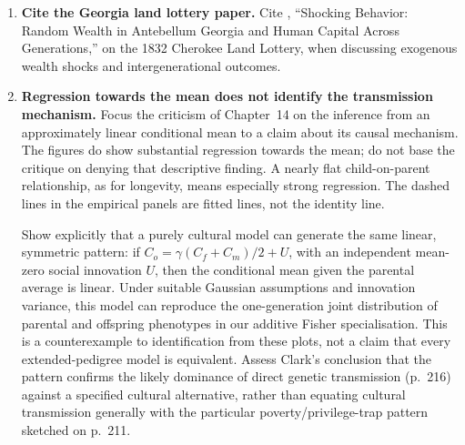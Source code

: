 \documentclass[12pt]{article}
\renewenvironment{itemize}{\begin{enumerate}}{\end{enumerate}}
\begin{document}
\begin{itemize}
\par\medskip
\textit{Preferred option: homogeneity of consumer demand.}
In the standard consumer model, doubling all prices and nominal income
leaves the budget set unchanged. With unchanged preferences and a unique
optimum, it therefore leaves demand unchanged. Homogeneity of demand is
a consequence of the model, not an additional assumption to be accepted
or discarded independently. A fitted demand equation that responds to
this common rescaling may be useful descriptively, but it cannot
represent the maintained choice model. Likewise, the phenotypic-assortment
model does not permit independent choices of $m$, $r$ and $h^2$: its
assumptions require $m=h^2r$.

\item \textbf{Cite the Georgia land lottery paper.}
Cite \citet{BleakleyFerrie2016}, ``Shocking Behavior: Random Wealth in
Antebellum Georgia and Human Capital Across Generations,'' on the 1832
Cherokee Land Lottery, when discussing exogenous wealth shocks and
intergenerational outcomes.

\item \textbf{Regression towards the mean does not identify the transmission mechanism.}
Focus the criticism of Chapter~14 on the inference from an approximately
linear conditional mean to a claim about its causal mechanism.
The figures do show substantial regression towards the mean; do not
base the critique on denying that descriptive finding. A nearly flat
child-on-parent relationship, as for longevity, means especially strong
regression. The dashed lines in the empirical panels are fitted lines,
not the identity line.

Show explicitly that a purely cultural model can generate the same
linear, symmetric pattern: if
$C_o=\gamma(C_f+C_m)/2+U$, with an independent mean-zero social
innovation $U$, then the conditional mean given the parental average
is linear. Under suitable Gaussian assumptions and innovation variance,
this model can reproduce the one-generation joint distribution of
parental and offspring phenotypes in our additive Fisher specialisation.
This is a counterexample to identification from these plots, not a claim
that every extended-pedigree model is equivalent. Assess Clark's
conclusion that the pattern confirms the likely dominance of direct
genetic transmission (p.~216) against a specified cultural alternative,
rather than equating cultural transmission generally with the particular
poverty/privilege-trap pattern sketched on p.~211.


\end{itemize}
\end{document}
